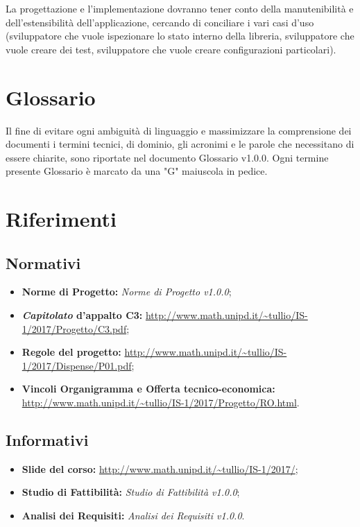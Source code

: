 \documentclass[./PianodiProgetto.tex]{subfiles}
\begin{document}
La progettazione e l'implementazione dovranno tener conto della manutenibilità e dell'estensibilità dell'applicazione, cercando di conciliare i vari casi d'uso (sviluppatore che vuole ispezionare lo stato interno della libreria, sviluppatore che vuole creare dei test, sviluppatore che vuole creare configurazioni particolari). 

\section{Glossario}
Il fine di evitare ogni ambiguità di linguaggio e massimizzare la comprensione dei documenti i termini tecnici, di dominio, gli acronimi e le parole che necessitano di essere chiarite, sono riportate nel documento Glossario v1.0.0. Ogni termine presente Glossario è marcato da una "G" maiuscola in pedice.

\section{Riferimenti}

\subsection{Normativi}
\begin{itemize}
	\item \textbf{Norme di Progetto:} \textit{Norme di Progetto v1.0.0};
	\item \textbf{\textit{Capitolato} d'appalto C3:} \url{http://www.math.unipd.it/~tullio/IS-1/2017/Progetto/C3.pdf};
	\item \textbf{Regole del progetto:} \url{http://www.math.unipd.it/~tullio/IS-1/2017/Dispense/P01.pdf};
	\item \textbf{Vincoli Organigramma e Offerta tecnico-economica:} \url{http://www.math.unipd.it/~tullio/IS-1/2017/Progetto/RO.html}.
\end{itemize}

\subsection{Informativi}
\begin{itemize}
	\item \textbf{Slide del corso:} \url{http://www.math.unipd.it/~tullio/IS-1/2017/};
	\item \textbf{Studio di Fattibilità:} \textit{Studio di Fattibilità v1.0.0};
	\item \textbf{Analisi dei Requisiti:} \textit{Analisi dei Requisiti v1.0.0}.
\end{itemize}
\end{document}
